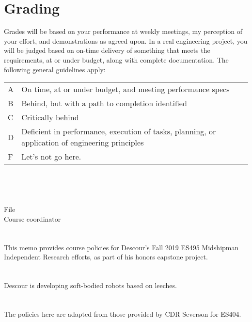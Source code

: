 \documentclass[10pt,courier]{navymemo}
\begin{document}
\clearpage
\section{Grading}
Grades will be based on your performance at weekly meetings, my perception of your effort, and demonstrations as agreed upon.  In a real engineering project, you will be judged based on on-time delivery of something that meets the requirements, at or under budget, along with complete documentation. The following general guidelines apply: 
\begin{center}
\begin{tabular}{lp{5in}}
A & On time, at or under budget, and meeting performance specs \\
B & Behind, but with a path to completion identified \\
C & Critically behind \\
D & Deficient in performance, execution of tasks, planning, or application of engineering principles \\
F & Let's not go here. \\
\end{tabular}
\end{center}

\noclosing{}\\
\signspace{}
\signature{D Evangelista}
\noindent\hspace*{4in}{235 Maury Hall}\\

\copyto{}
File\\
Course coordinator


\navyrecordnote
\thispagestyle{empty}


\navyrecordnotesubjline

\section{} This memo provides course policies for Descour's Fall 2019 ES495 Midshipman Independent Research efforts, as part of his honors capstone project.

\section{} Descour is developing soft-bodied robots based on leeches.  

\section{} The policies here are adapted from those provided by CDR Severson for ES404.  
\end{document}
